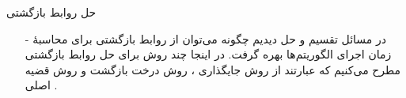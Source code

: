 \begin{frame}{‌حل روابط بازگشتی}
\begin{itemize}\itemr
\item[-]
در مسائل تقسیم و حل دیدیم چگونه می‌توان از روابط بازگشتی برای محاسبهٔ زمان اجرای الگوریتم‌ها بهره گرفت. در اینجا چند روش برای حل روابط بازگشتی مطرح می‌کنیم که عبارتند از روش جایگذاری
، روش درخت بازگشت
و روش قضیه اصلی
 .
\end{itemize}
\end{frame}